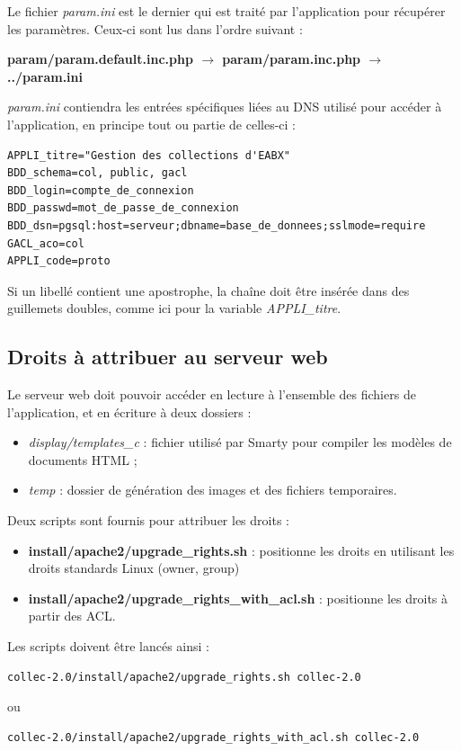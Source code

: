 Le fichier \textit{param.ini} est le dernier qui est traité par l'application pour récupérer les paramètres. Ceux-ci sont lus dans l'ordre suivant :

\textbf{param/param.default.inc.php $\rightarrow$ param/param.inc.php $\rightarrow$ ../param.ini}

\textit{param.ini} contiendra les entrées spécifiques liées au DNS utilisé pour accéder à l'application, en principe tout ou partie de celles-ci :
\begin{lstlisting}
APPLI_titre="Gestion des collections d'EABX"
BDD_schema=col, public, gacl
BDD_login=compte_de_connexion
BDD_passwd=mot_de_passe_de_connexion
BDD_dsn=pgsql:host=serveur;dbname=base_de_donnees;sslmode=require
GACL_aco=col
APPLI_code=proto
\end{lstlisting}

Si un libellé contient une apostrophe, la chaîne doit être insérée dans des guillemets doubles, comme ici pour la variable \textit{APPLI\_titre}.


\subsection{Droits à attribuer au serveur web}
\label{droitsApache}
Le serveur web doit pouvoir accéder en lecture à l'ensemble des fichiers de l'application, et en écriture à deux dossiers :
\begin{itemize}
\item \textit{display/templates\_c} : fichier utilisé par Smarty pour compiler les modèles de documents HTML ;
\item \textit{temp} : dossier de génération des images et des fichiers temporaires.
\end{itemize}

Deux scripts sont fournis pour attribuer les droits : 
\begin{itemize}
\item \textbf{install/apache2/upgrade\_rights.sh} : positionne les droits en utilisant les droits standards Linux (owner, group)
\item \textbf{install/apache2/upgrade\_rights\_with\_acl.sh} : positionne les droits à partir des ACL.
\end{itemize}

Les scripts doivent être lancés ainsi :
\begin{lstlisting}
collec-2.0/install/apache2/upgrade_rights.sh collec-2.0
\end{lstlisting}
ou 
\begin{lstlisting}
collec-2.0/install/apache2/upgrade_rights_with_acl.sh collec-2.0
\end{lstlisting}


